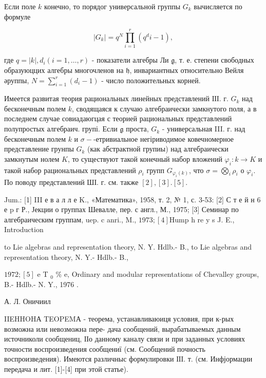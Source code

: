 \documentclass[10pt]{article}
\begin{document}
Если поле $k$ конечно, то порядог универсальной группы $G_{k}$ вычисляется по формуле



\[

\left|G_{k}\right|=q^{N} \prod_{i=1}^{r}\left(q^{d} i-1\right),

\]



где $q=|k|, d_{i}(i=1, \ldots, r)$ - показатели алгебры Ли $\mathfrak{g}$, т. е. степени свободных образуюццих алгебры многочленов на $\mathfrak{h}$, инвариантных относительно Вейля әруппы, $N=\sum_{i=1}^{r}\left(d_{i}-1\right)$ - число положительных корней.



Имеется развитая теория рациональных линейных представлений ІІІ. г. $G_{k}$ над бесконечным полем $k$, сводящаяся к случаю алгебраически замкнутого поля, а в последнем случае совиадаюгцая с теорией рациональных представлений полупростых алгебраич. групі. Если $\mathfrak{g}$ проста, $G_{k}$ - универсальная III. г. над бесконечным полем $k$ и $\sigma-$-етривиальное негіриводимое ковечномерное представление грунпы $G_{k}$ (как абстрактной групиы) над алгебраически замкнутым нолем $K$, то существуют такой конечный набор вложений $\varphi_{i}: k \longrightarrow K$ и такой набор рациональных представлений $\rho_{i}$ групп $G_{\varphi_{i}(k)}$, что $\sigma=\bigotimes_{i} \rho_{i}$ о $\varphi_{i}$. По поводу представлений ШІ. г. см. также $[2],[3] .[5]$.



Jum.: [1] III е в а л л е K., «Математика», 1958, т. 2, № 1, с. 3-53: [2] С т е й н 6 е $\mathrm{p}$ г Р., Јекции о группах Шевалле, пер. с англ., М., 1975; [3] Семинар по алгебраическим группам, uep. c anri., M., $1973 ;[4] \mathrm{H} \mathrm{u} \mathrm{m} \mathrm{p}$ h $\mathrm{re}$ y s J. E., Introduction

to Lie algebras and representation theory, N. Y. Hdlb.- B., to Lie algebras and representation theory, N. Y.- Hdlb.- B.,

$1972 ;[5]$ e T $_{0}$ \% e, Ordinary and modular representations of Chevalley groups, B.- Hdlb.- N. Y., 1976 .



А. Л. Оничиил



IIEHHOHА TEOPEMА - теорема, устанавливаюиця условия, при к-рых возможна или невозможна пере- дача сообщений, вырабатываемых данным источниколи сообщениц, ІІо данному каналу связи и при заданных условиях точности воспроизведения сообщениї (см. Сообщений почность воспроизведения). Имеются различныс формулировки ІІІ. т. (см. Инфјормации передача и лит. [1]-[4] при этой статье).
\end{document}

